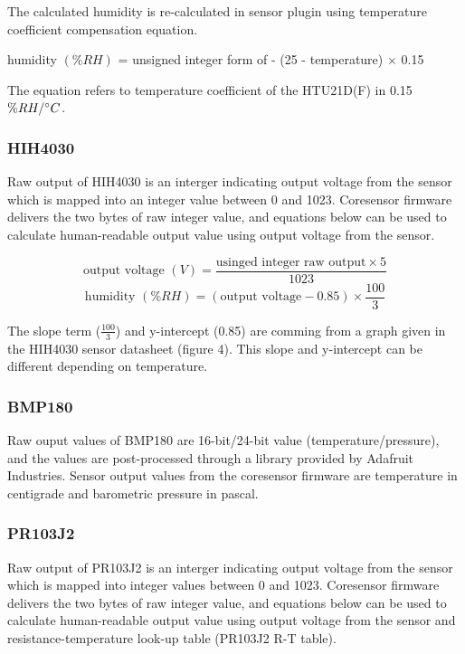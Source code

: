 \bigbreak
 The calculated humidity is re-calculated in sensor plugin using temperature coefficient compensation equation. \\

{\centering
 humidity \((\%RH)\) = unsigned integer form of  - (25 - temperature) $\times$ 0.15
 \par
}

\bigbreak
The equation refers to temperature coefficient of the HTU21D(F) in 0.15 \(\%RH/\degree C\).

\subsubsection{ HIH4030}

Raw output of HIH4030 is an interger indicating output voltage from the sensor which is mapped into an integer value between 0 and 1023. Coresensor firmware delivers the two bytes of raw integer value, and equations below can be used to calculate human-readable output value using output voltage from the sensor.

{\centering
 \[ \text{output voltage \((V)\)} = \frac{\text{usinged integer raw output} \times 5}{1023} \] 
 \[ \text{humidity \((\%RH)\)} = (\text{output voltage} - 0.85) \times \frac{100}{3} \]
 \par
 }
\bigbreak
The slope term (\(\frac{100}{3}\)) and y-intercept (0.85) are comming from a graph given in the HIH4030 sensor datasheet (figure 4). This slope and y-intercept can be different depending on temperature.

\subsubsection{ BMP180}

Raw ouput values of BMP180 are 16-bit/24-bit value (temperature/pressure), and the values are post-processed through a library provided by Adafruit Industries. Sensor output values from the coresensor firmware are temperature in centigrade and barometric pressure in pascal.


\subsubsection{ PR103J2}

Raw output of PR103J2 is an interger indicating output voltage from the sensor which is mapped into integer values between 0 and 1023. Coresensor firmware delivers the two bytes of raw integer value, and equations below can be used to calculate human-readable output value using output voltage from the sensor and resistance-temperature look-up table (PR103J2 R-T table).

